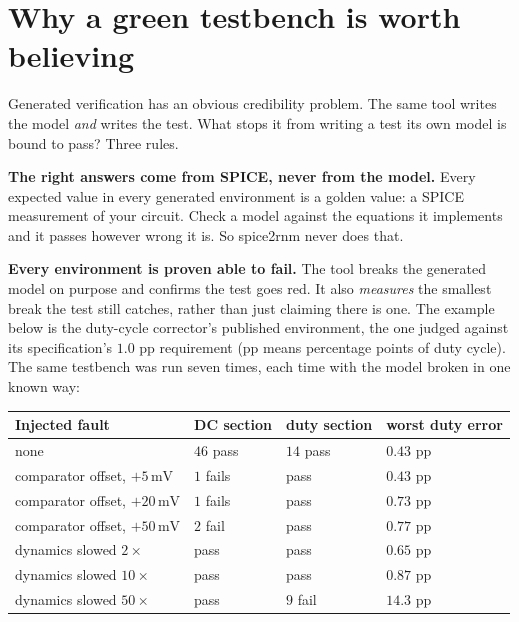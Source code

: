 \documentclass[11pt,a4paper]{article}
\newcommand{\unit}[1]{\,\textrm{#1}}
\begin{document}
\section{Why a green testbench is worth believing}

Generated verification has an obvious credibility problem. The same
tool writes the model \emph{and} writes the test. What stops it from
writing a test its own model is bound to pass? Three rules.

\textbf{The right answers come from SPICE, never from the model.}
Every expected value in every generated environment is a golden value:
a SPICE measurement of your circuit. Check a model against the
equations it implements and it passes however wrong it is. So
spice2rnm never does that.

\textbf{Every environment is proven able to fail.} The tool breaks the
generated model on purpose and confirms the test goes red. It also
\emph{measures} the smallest break the test still catches, rather than
just claiming there is one. The example below is the duty-cycle
corrector's published environment, the one judged against its
specification's $1.0$ pp requirement (pp means percentage points of
duty cycle). The same testbench was run seven times, each time with
the model broken in one known way:

\begin{center}
\begin{tabular}{@{}llll@{}}
\toprule
\textbf{Injected fault} & \textbf{DC section} & \textbf{duty section} & \textbf{worst duty error} \\
\midrule
none                              & $46$ pass & $14$ pass & $0.43$ pp \\
comparator offset, $+5\unit{mV}$  & $1$ fails & pass      & $0.43$ pp \\
comparator offset, $+20\unit{mV}$ & $1$ fails & pass      & $0.73$ pp \\
comparator offset, $+50\unit{mV}$ & $2$ fail  & pass      & $0.77$ pp \\
dynamics slowed $2\times$         & pass      & pass      & $0.65$ pp \\
dynamics slowed $10\times$        & pass      & pass      & $0.87$ pp \\
dynamics slowed $50\times$        & pass      & $9$ fail  & $14.3$ pp \\
\bottomrule
\end{tabular}
\end{center}
\end{document}
